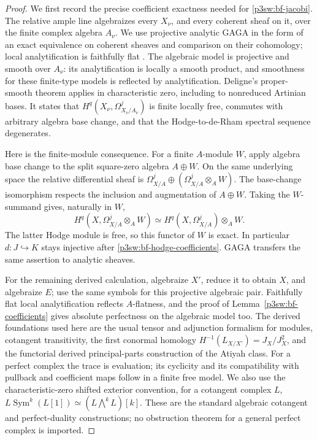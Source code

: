 \documentclass[11pt]{article}
\numberwithin{equation}{section}
\begin{document}
\begin{proof}
We first record the precise coefficient exactness needed for
\eqref{p3sw:bf-jacobi}.  The relative ample line algebraizes every
\(X_\nu\), and every coherent sheaf on it, over the finite complex
algebra \(A_\nu\).  We use projective analytic GAGA in the form of
an exact equivalence on coherent sheaves and comparison on their
cohomology; local analytification is faithfully flat
\cite{P3SWSerreGAGA1956}.  The algebraic model is projective and
smooth over \(A_\nu\): its analytification is locally a smooth
product, and smoothness for these finite-type models is reflected
by analytification.  Deligne's proper-smooth theorem
\cite[Theorem~5.5]{P3SWDeligne1968} applies in characteristic zero,
including to nonreduced Artinian bases.  It states that
\(H^q(X_\nu,\Omega^j_{X_\nu/A_\nu})\) is finite locally free,
commutes with arbitrary algebra base change, and that the
Hodge-to-de-Rham spectral sequence degenerates.

Here is the finite-module consequence.  For a finite \(A\)-module
\(W\), apply algebra base change to the split square-zero algebra
\(A\oplus W\).  On the same underlying space the relative
differential sheaf is
\(\Omega^j_{X/A}\oplus(\Omega^j_{X/A}\otimes_AW)\).
The base-change isomorphism respects the inclusion and augmentation
of \(A\oplus W\).  Taking the \(W\)-summand gives, naturally in \(W\),
\begin{equation}
\label{p3sw:bf-hodge-coefficients}
 H^q(X,\Omega^j_{X/A}\otimes_AW)
       \simeq H^q(X,\Omega^j_{X/A})\otimes_AW.
\end{equation}
The latter Hodge module is free, so this functor of \(W\) is exact.
In particular \(d:J\hookrightarrow K\) stays injective after
\eqref{p3sw:bf-hodge-coefficients}.  GAGA transfers the same
assertion to analytic sheaves.

For the remaining derived calculation, algebraize \(X'\), reduce
it to obtain \(X\), and algebraize \(E\); use the same symbols for
this projective algebraic pair.  Faithfully flat local
analytification reflects \(A\)-flatness, and the proof of
Lemma~\ref{p3sw:bf-coefficients} gives absolute perfectness on
the algebraic model too.  The derived foundations used here are
the usual tensor and adjunction formalism for modules, cotangent
transitivity, the first conormal homology
\(H^{-1}(L_{X/X'})=J_X/J_X^2\), and the functorial derived
principal-parts construction of the Atiyah class.  For a perfect
complex the trace is evaluation; its cyclicity and its
compatibility with pullback and coefficient maps follow in a
finite free model.  We also use the characteristic-zero shifted
exterior convention, for a cotangent complex \(L\),
\(L\operatorname{Sym}^k(L[1])\simeq
(L\!\bigwedge^k L)[k]\).
These are the standard algebraic cotangent and perfect-duality
constructions; no obstruction theorem for a general perfect
complex is imported.


\end{proof}
\end{document}
